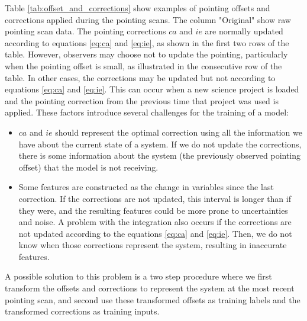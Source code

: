 Table \ref{tab:offset_and_corrections} show examples of pointing offsets and corrections applied during the pointing scans.
The column "Original" show raw pointing scan data.
The pointing corrections $ca$ and $ie$ are normally updated according to equations \eqref{eq:ca} and \eqref{eq:ie}, 
as shown in the first two rows of the table.
However, observers may choose not to update the pointing, particularly when the pointing offset is small, as illustrated in the consecutive row of the table.
In other cases, the corrections may be updated but not according to equations \eqref{eq:ca} and \eqref{eq:ie}.
This can occur when a new science project is loaded and the pointing correction from the previous time that project was used is applied.
These factors introduce several challenges for the training of a model:
\begin{itemize}
    \item $ca$ and $ie$ should represent the optimal correction using all the information we have about the current state of a system.
    If we do not update the corrections, there is some information about the system (the previously observed pointing offset) that the model is not receiving.
    \item Some features are constructed as the change in variables since the last correction.
    If the corrections are not updated, this interval is longer than if they were, and the resulting features could be more prone to uncertainties and noise.
    A problem with the integration also occurs if the corrections are not updated according to the equations \eqref{eq:ca} and \eqref{eq:ie}.
    Then, we do not know when those corrections represent the system, resulting in inaccurate features.
\end{itemize}

A possible solution to this problem is a two step procedure where we first transform the offsets and corrections to represent the system at the most recent pointing scan,
and second use these transformed offsets as training labels and the transformed corrections as training inputs.

